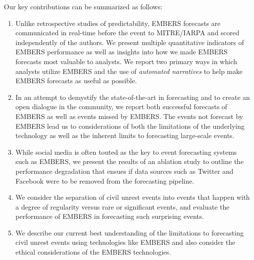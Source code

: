 Our key contributions can be summarized as follows:
\begin{enumerate}
\setlength\itemsep{0pt}
\itemsep0em
\item %
  Unlike retrospective studies of predictability, EMBERS forecasts are communicated in real-time before the
event to MITRE/IARPA and scored independently of the authors.
We present multiple quantitative indicators of EMBERS performance
as well as insights into how
we made EMBERS forecasts most valuable to analysts. We report two primary
ways in which analysts utilize EMBERS and the use of {\it automated
narratives} to help make EMBERS forecasts as useful as possible.

\item
In an attempt to demystify the state-of-the-art
in forecasting and to create an open dialogue in the community, we report both successful
forecasts of EMBERS as well as events missed by EMBERS. The events not forecast by EMBERS lead us to
considerations of both the limitations of the underlying technology as well as
the inherent limits to forecasting large-scale events.
\item
While social media is often touted as the key to event forecasting
systems such as EMBERS, we present the results of an ablation study to outline
the performance degradation that ensues if data sources
such as Twitter and Facebook were to be removed from the forecasting pipeline.
\item
We consider the separation of civil unrest events into events
that happen with a degree of regularity versus rare
or significant
events, and evaluate the performance of EMBERS in forecasting such
surprising events.
\item
We describe our current best understanding of the limitations to
forecasting civil unrest events using technologies like EMBERS and
also consider the ethical considerations of the EMBERS technologies.
\end{enumerate}

